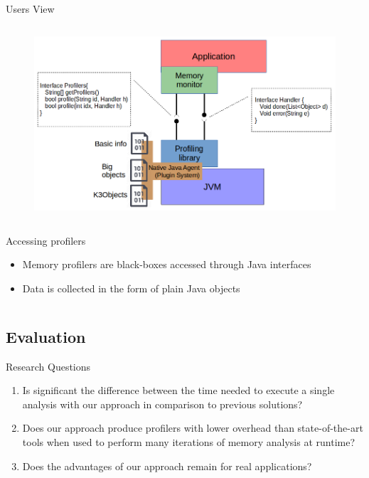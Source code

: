 \documentclass[10pt,xcolor={dvipsnames}]{beamer}
\begin{document}
	\begin{frame}{Users View}
		\begin{columns}
			\begin{figure}
				\centering
				\includegraphics[scale=0.35]{../chapter6/fig/user-profiler-view.png}
			\end{figure}
		\end{columns}
		\vspace{.3cm}
		\begin{columns}
			\column{0.25\textwidth}
			\column{0.65\textwidth}
			\begin{alertblock}{Accessing profilers}
				\begin{scriptsize}
					\begin{itemize}
						\item Memory profilers are black-boxes accessed through Java interfaces
						\item Data is collected in the form of plain Java objects
					\end{itemize}
				\end{scriptsize}
			\end{alertblock}
		\end{columns}
	\end{frame}
	
	\subsection[Evaluation]{Evaluation}
	
	\begin{frame}{Research Questions}
		\begin{enumerate}[RQ1]\setlength{\itemsep}{1cm}
			\item Is significant the difference between the time needed to execute a single analysis with our approach in comparison to previous solutions?  
			\item Does our approach produce profilers with lower overhead than state-of-the-art tools when used to perform many iterations of memory analysis at runtime?
			\item Does the advantages of our approach remain for real applications?
		\end{enumerate}
	\end{frame}
	
\end{document}
